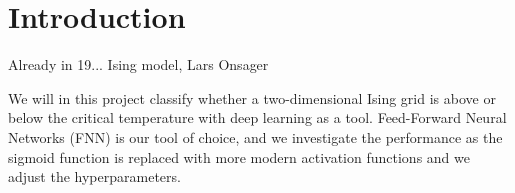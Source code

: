 \section{Introduction} \label{sec:introduction}
Already in 19... Ising model, Lars Onsager

We will in this project classify whether a two-dimensional Ising grid is above or below the critical temperature with deep learning as a tool. Feed-Forward Neural Networks (FNN) is our tool of choice, and we investigate the performance as the sigmoid function is replaced with more modern activation functions and we adjust the hyperparameters. 


